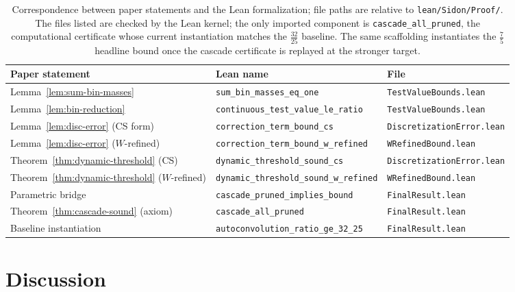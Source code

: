 \documentclass[11pt, letterpaper]{article}
\theoremstyle{paperplain}
\theoremstyle{paperdef}
\begin{document}
\begin{table}[h]
\centering\small
\begin{tabular}{lll}
  \toprule
  \textbf{Paper statement} & \textbf{Lean name} & \textbf{File} \\
  \midrule
  Lemma~\ref{lem:sum-bin-masses}
    & \texttt{sum\_bin\_masses\_eq\_one}
    & \texttt{TestValueBounds.lean} \\
  Lemma~\ref{lem:bin-reduction}
    & \texttt{continuous\_test\_value\_le\_ratio}
    & \texttt{TestValueBounds.lean} \\
  Lemma~\ref{lem:disc-error} (CS form)
    & \texttt{correction\_term\_bound\_cs}
    & \texttt{DiscretizationError.lean} \\
  Lemma~\ref{lem:disc-error} ($W$-refined)
    & \texttt{correction\_term\_bound\_w\_refined}
    & \texttt{WRefinedBound.lean} \\
  Theorem~\ref{thm:dynamic-threshold} (CS)
    & \texttt{dynamic\_threshold\_sound\_cs}
    & \texttt{DiscretizationError.lean} \\
  Theorem~\ref{thm:dynamic-threshold} ($W$-refined)
    & \texttt{dynamic\_threshold\_sound\_w\_refined}
    & \texttt{WRefinedBound.lean} \\
  Parametric bridge
    & \texttt{cascade\_pruned\_implies\_bound}
    & \texttt{FinalResult.lean} \\
  Theorem~\ref{thm:cascade-sound} (axiom)
    & \texttt{cascade\_all\_pruned}
    & \texttt{FinalResult.lean} \\
  Baseline instantiation
    & \texttt{autoconvolution\_ratio\_ge\_32\_25}
    & \texttt{FinalResult.lean} \\
  \bottomrule
\end{tabular}
\caption[Correspondence between paper statements and the Lean formalization.]{Correspondence between paper statements and the Lean
formalization; file paths are relative to \texttt{lean/Sidon/Proof/}.
The files listed are checked by the Lean kernel; the only imported
component is \texttt{cascade\_all\_pruned}, the computational
certificate whose current instantiation matches the $\tfrac{32}{25}$
baseline.  The same scaffolding instantiates the $\tfrac{7}{5}$
headline bound once the cascade certificate is replayed at the
stronger target.}
\label{tab:lean-map}
\end{table}


\section{Discussion}\label{sec:discussion}
\end{document}
